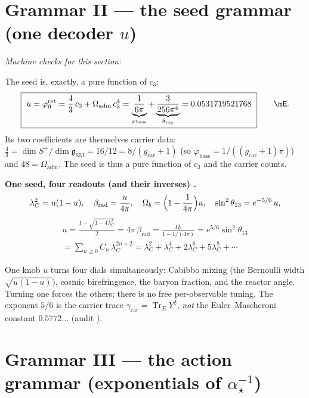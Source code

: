 \documentclass[11pt,a4paper]{article}
\newcommand{\gcar}{g_{\mathrm{car}}}
\newcommand{\Oadm}{\Omega_{\mathrm{adm}}}
\newcommand{\cthree}{c_3}
\newcommand{\phibase}{\varphi_{\mathrm{base}}}
\newcommand{\useed}{u}
\newcommand{\dtop}{\delta_{\mathrm{top}}}
\newcommand{\betarad}{\beta_{\mathrm{rad}}}
\newcommand{\lC}{\lambda_C}
\newcommand{\ainv}{\alpha^{-1}_\star}
\newcommand{\dimg}{\dim\mathfrak g_{\mathrm{SM}}}
\theoremstyle{definition}
\begin{document}
\section{Grammar II --- the seed grammar (one decoder $\useed$)}
\noindent\emph{Machine checks for this section:} 


The seed is, exactly, a pure function of $\cthree$:
\begin{equation}
  \boxed{\ \useed=\varphi^{\mathrm{ret}}_0=\frac43\,\cthree+\Oadm\,\cthree^4
  =\underbrace{\frac{1}{6\pi}}_{\phibase}+\underbrace{\frac{3}{256\pi^4}}_{\dtop}=0.0531719521768\ }\qquad\mE.
\end{equation}
Its two coefficients are themselves carrier data: $\tfrac43=\dim S^+/\dimg=16/12=8/(\gcar+1)$ (so
$\phibase=1/((\gcar+1)\pi)$) and $48=\Oadm$. The seed is thus a pure function of $\cthree$ and the
carrier counts.

\par\smallskip\noindent\textbf{One seed, four readouts (and their inverses) \mE.}
\[
  \lC^2=\useed(1-\useed),\quad
  \betarad=\frac{\useed}{4\pi},\quad
  \Omega_b=\Bigl(1-\frac{1}{4\pi}\Bigr)\useed,\quad
  \sin^2\theta_{13}=e^{-5/6}\,\useed,
\]
\[
\begin{gathered}
  \useed=\frac{1-\sqrt{1-4\lC^2}}{2}=4\pi\,\betarad=\frac{\Omega_b}{1-1/(4\pi)}=e^{5/6}\sin^2\theta_{13}\\[2pt]
  =\sum_{n\ge0}C_n\,\lC^{2n+2}=\lC^2+\lC^4+2\lC^6+5\lC^8+\cdots
\end{gathered}
\]
\par\smallskip

\noindent One knob $\useed$ turns four dials simultaneously: Cabibbo mixing (the Bernoulli width
$\sqrt{\useed(1-\useed)}$), cosmic birefringence, the baryon fraction, and the reactor angle. Turning
one forces the others; there is no free per-observable tuning. The exponent $5/6$ is the carrier
trace $\gamma_{\mathrm{car}}=\operatorname{Tr}_E Y^2$, \emph{not} the Euler--Mascheroni constant
$0.5772\ldots$ (audit \mO).

\section{Grammar III --- the action grammar (exponentials of $\ainv$)}
\end{document}

